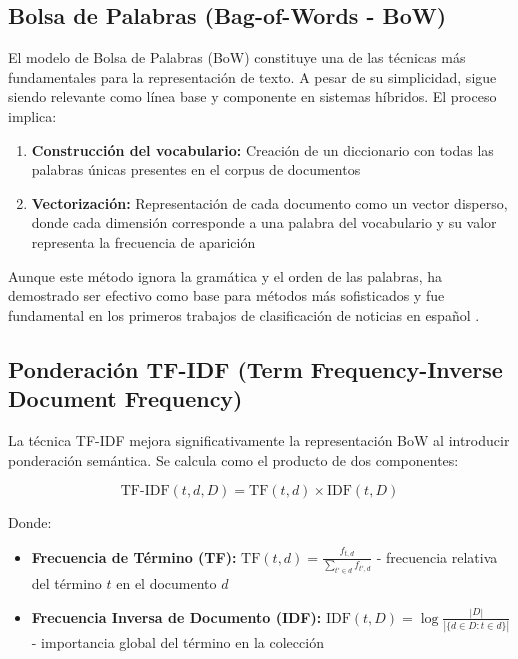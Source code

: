 \subsection{Bolsa de Palabras (Bag-of-Words - BoW)}

El modelo de Bolsa de Palabras (BoW) constituye una de las técnicas más fundamentales para la representación de texto. A pesar de su simplicidad, sigue siendo relevante como línea base y componente en sistemas híbridos. El proceso implica:

\begin{enumerate}
    \item \textbf{Construcción del vocabulario:} Creación de un diccionario con todas las palabras únicas presentes en el corpus de documentos
    \item \textbf{Vectorización:} Representación de cada documento como un vector disperso, donde cada dimensión corresponde a una palabra del vocabulario y su valor representa la frecuencia de aparición
\end{enumerate}

Aunque este método ignora la gramática y el orden de las palabras, ha demostrado ser efectivo como base para métodos más sofisticados y fue fundamental en los primeros trabajos de clasificación de noticias en español \cite{acosta2019construccion}.

\subsection{Ponderación TF-IDF (Term Frequency-Inverse Document Frequency)}

La técnica TF-IDF mejora significativamente la representación BoW al introducir ponderación semántica. Se calcula como el producto de dos componentes:

\begin{equation}
\text{TF-IDF}(t,d,D) = \text{TF}(t,d) \times \text{IDF}(t,D)
\end{equation}

Donde:
\begin{itemize}
    \item \textbf{Frecuencia de Término (TF):} $\text{TF}(t,d) = \frac{f_{t,d}}{\sum_{t' \in d} f_{t',d}}$ - frecuencia relativa del término $t$ en el documento $d$
    \item \textbf{Frecuencia Inversa de Documento (IDF):} $\text{IDF}(t,D) = \log\frac{|D|}{|\{d \in D : t \in d\}|}$ - importancia global del término en la colección
\end{itemize}

